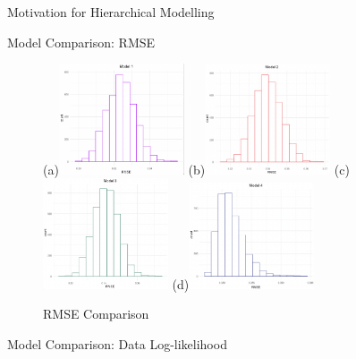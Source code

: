 \documentclass{beamer}
\begin{document}
\begin{frame}{Motivation for Hierarchical Modelling}
\begin{frame}{Model Comparison: RMSE}
    \begin{figure}[h!]
        \centering
        
        \subfigure(a){\includegraphics[width=0.33\textwidth]{plots/model1_rmse.png}} 
        \subfigure(b){\includegraphics[width=0.33\textwidth]{plots/model2_rmse.png}} 
        \subfigure(c){\includegraphics[width=0.33\textwidth]{plots/model3_rmse.png}}
        \subfigure(d){\includegraphics[width=0.33\textwidth]{plots/model4_rmse.png}}
       
      
        \caption{RMSE Comparison}
      
    
      \end{figure}   
\end{frame}

\begin{frame}{Model Comparison: Data Log-likelihood}
    \begin{figure}[h!]
        \centering
        

\end{figure}
\end{frame}
\end{frame}
\end{document}
